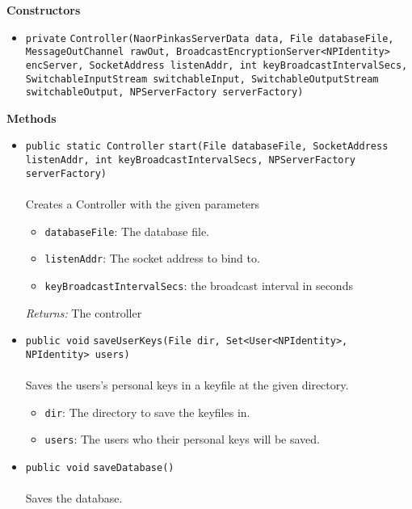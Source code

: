 \textbf{\sffamily Constructors}
\begin{itemize}
\item \lstinline|private| \lstinline|Controller|\lstinline|(NaorPinkasServerData data, File databaseFile, MessageOutChannel rawOut, BroadcastEncryptionServer<NPIdentity> encServer, SocketAddress listenAddr, int keyBroadcastIntervalSecs, SwitchableInputStream switchableInput, SwitchableOutputStream switchableOutput, NPServerFactory serverFactory)| \\[-0.6em]




\end{itemize}


\textbf{\sffamily Methods}
\begin{itemize}
\item \lstinline|public static Controller| \lstinline|start|\lstinline|(File databaseFile, SocketAddress listenAddr, int keyBroadcastIntervalSecs, NPServerFactory serverFactory)|\\ \\[-0.6em]
Creates a Controller with the given parameters
\begin{itemize}
\item \lstinline|databaseFile|: The database file.
\item \lstinline|listenAddr|: The socket address to bind to.
\item \lstinline|keyBroadcastIntervalSecs|: the broadcast interval in seconds
\end{itemize}

\emph{Returns:} The controller

\item \lstinline|public void| \lstinline|saveUserKeys|\lstinline|(File dir, Set<User<NPIdentity>, NPIdentity> users)|\\ \\[-0.6em]
Saves the users's personal keys in a keyfile at the given directory.
\begin{itemize}
\item \lstinline|dir|: The directory to save the keyfiles in.
\item \lstinline|users|: The users who their personal keys will be saved.
\end{itemize}



\item \lstinline|public void| \lstinline|saveDatabase|\lstinline|()|\\ \\[-0.6em]
Saves the database.




\end{itemize}
